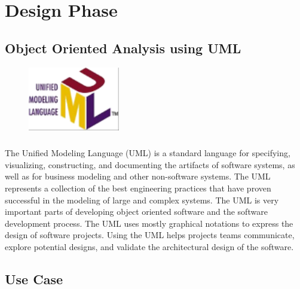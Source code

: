 \chapter{Design Phase}
\section{Object Oriented Analysis using UML}
\begin{figure}
\includegraphics[width=4cm]{./images/implementation/uml}
\end{figure}
\paragraph{}The Unified Modeling Language (UML) is a standard language for specifying, visualizing, constructing, and documenting the artifacts
 of software systems, as well as for business modeling and other non-software systems. The UML represents
a collection of the best engineering practices that have proven successful in the modeling of large and complex systems. The UML is very important parts of developing
object oriented software and the software development process. The UML uses mostly graphical notations to express the design of software projects. Using the UML
helps projects teams communicate, explore potential designs, and validate the architectural design of the software.\par
\section{Use Case}
